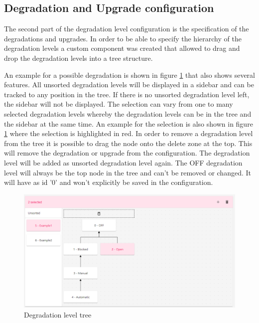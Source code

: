 \subsection{Degradation and Upgrade configuration}
\label{sec:deg_and_upg}

The second part of the degradation level configuration is the specification of the degradations and upgrades. In order to be able to specify the hierarchy of the degradation levels a custom component was created that allowed to drag and drop the degradation levels into a tree structure.

An example for a possible degradation is shown in figure \ref{fig:degradation_level_tree} that also shows several features. All unsorted degradation levels will be displayed in a sidebar and can be tracked to any position in the tree. If there is no unsorted degradation level left, the sidebar will not be displayed. The selection can vary from one to many selected degradation levels whereby the degradation levels can be in the tree and the sidebar at the same time. An example for the selection is also shown in figure \ref{fig:degradation_level_tree} where the selection is highlighted in red. In order to remove a degradation level from the tree it is possible to drag the node onto the delete zone at the top. This will remove the degradation or upgrade from the configuration. The degradation level will be added as unsorted degradation level again. The OFF degradation level will always be the top node in the tree and can't be removed or changed. It will have as id '0' and won't explicitly be saved in the configuration.

\begin{figure}[ht]
    \centering
    \includegraphics[width=\textwidth]{img/degradation_tree.png}
    \caption{Degradation level tree}
    \label{fig:degradation_level_tree}
\end{figure}

